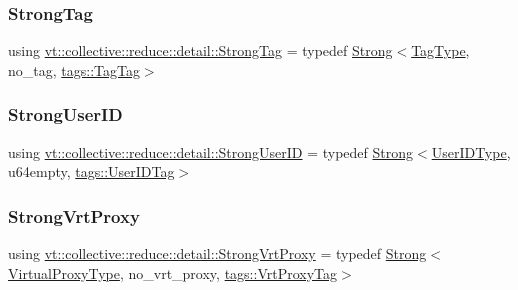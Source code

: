 \subsubsection{\texorpdfstring{Strong\+Tag}{StrongTag}}
{\footnotesize\ttfamily using \hyperlink{namespacevt_1_1collective_1_1reduce_1_1detail_a5e1b708dc12ad0d1209a354ed21ed744}{vt\+::collective\+::reduce\+::detail\+::\+Strong\+Tag} = typedef \hyperlink{namespacevt_adbd3338278905742eb2de6db590fd2f1}{Strong}$<$\hyperlink{namespacevt_a84ab281dae04a52a4b243d6bf62d0e52}{Tag\+Type}, no\+\_\+tag, \hyperlink{structvt_1_1collective_1_1reduce_1_1detail_1_1tags_1_1_tag_tag}{tags\+::\+Tag\+Tag}$>$}

\mbox{\label{namespacevt_1_1collective_1_1reduce_1_1detail_af9e42b20d1be7dccc1b5e587f0387e02}} 
\subsubsection{\texorpdfstring{Strong\+User\+ID}{StrongUserID}}
{\footnotesize\ttfamily using \hyperlink{namespacevt_1_1collective_1_1reduce_1_1detail_af9e42b20d1be7dccc1b5e587f0387e02}{vt\+::collective\+::reduce\+::detail\+::\+Strong\+User\+ID} = typedef \hyperlink{namespacevt_adbd3338278905742eb2de6db590fd2f1}{Strong}$<$\hyperlink{namespacevt_1_1collective_1_1reduce_1_1detail_ae82d7b96b0885b9b7dfb0104398beead}{User\+I\+D\+Type}, u64empty, \hyperlink{structvt_1_1collective_1_1reduce_1_1detail_1_1tags_1_1_user_i_d_tag}{tags\+::\+User\+I\+D\+Tag}$>$}

\mbox{\label{namespacevt_1_1collective_1_1reduce_1_1detail_a492943cffff6d1a92386468d46f589df}} 
\subsubsection{\texorpdfstring{Strong\+Vrt\+Proxy}{StrongVrtProxy}}
{\footnotesize\ttfamily using \hyperlink{namespacevt_1_1collective_1_1reduce_1_1detail_a492943cffff6d1a92386468d46f589df}{vt\+::collective\+::reduce\+::detail\+::\+Strong\+Vrt\+Proxy} = typedef \hyperlink{namespacevt_adbd3338278905742eb2de6db590fd2f1}{Strong}$<$\hyperlink{namespacevt_a1b417dd5d684f045bb58a0ede70045ac}{Virtual\+Proxy\+Type}, no\+\_\+vrt\+\_\+proxy, \hyperlink{structvt_1_1collective_1_1reduce_1_1detail_1_1tags_1_1_vrt_proxy_tag}{tags\+::\+Vrt\+Proxy\+Tag}$>$}

